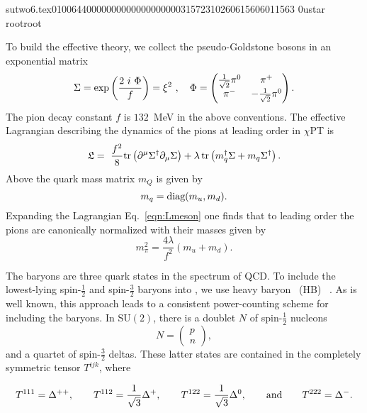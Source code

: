                                                                                                                                                                                                                                                                                       sutwo6.tex                                                                                          0100644 0000000 0000000 00000315723 10260615606 011563  0                                                                                                    ustar   root                            root                                                                                                                                                                                                                   \documentclass[prd,amssymb,amsmath,showpacs,nofootinbib,superscriptaddress]{revtex4}
\begin{document}
To build the effective theory, we collect the pseudo-Goldstone bosons
in an exponential matrix 
\begin{equation}
  \S = 
    {\rm exp} \left( \frac{2\ i\ \Phi}{f} \right) = \xi ^2 \ ,\quad  
      \Phi  = 
        \begin{pmatrix}
          \frac{1}{\sqrt{2}}\pi^0 & \pi^+ \\
            \pi^- & -\frac{1}{\sqrt{2}}\pi^0 
        \end{pmatrix}.
\label{eq:Sigma}
\end{equation}
The pion decay constant $f$ is $132$~MeV in the above conventions.
The effective Lagrangian describing the dynamics of the pions at
leading order in $\chi$PT is \cite{Gasser:1983yg}
\begin{eqnarray}
  \mathfrak{L}  =\ 
    \frac{f^2}{8} \tr \left( \partial^\mu \S ^\dagger
      \partial_\mu \S \right)
     + \l \, \tr \left(m_q^\dagger  \S  + m_q \S^\dagger \right).
\label{eqn:Lmeson}
\end{eqnarray}
%
Above the quark mass matrix $m_Q$ is given by
\begin{equation}
m_q =  \text{diag} (m_u, m_d).
\end{equation}
Expanding the Lagrangian Eq.~\eqref{eqn:Lmeson} one finds that to
leading order the pions are canonically normalized with their masses
given by
\begin{equation}
m^2_{\pi} = \frac{4 \lambda}{f^2} (m_u + m_d) 
\label{eq:mesonmass}.
\end{equation}


The baryons are three quark states in the spectrum of QCD. To include the 
lowest-lying spin-$\frac{1}{2}$ and spin-$\frac{3}{2}$ baryons into \CPT, 
we use heavy baryon \CPT\ 
(HB\CPT)~%
\cite{Jenkins:1991ne,Jenkins:1990jv,Jenkins:1991es,%
Jenkins:1992ts,Bernard:1992qa,Bernard:1995dp}. 
As is well known, this approach leads to a consistent power-counting scheme
for including the baryons.  In SU$(2)$, there is a doublet $N$ of 
spin-$\frac{1}{2}$ nucleons
\begin{equation}
N = 
\begin{pmatrix}
p \\
n
\end{pmatrix}
,\end{equation}
and a quartet of spin-$\frac{3}{2}$ deltas. These latter states are contained 
in the completely symmetric tensor $T^{ijk}$, where

\begin{equation}
T^{111} = {\Delta}^{++}, \qquad T^{112} = \frac{1}{\sqrt{3}} {\Delta}^+, \qquad T^{122} = \frac{1}{\sqrt{3}} {\Delta}^0, 
\qquad \text{and} \qquad T^{222} = {\Delta}^-
.\end{equation}
\end{document}
